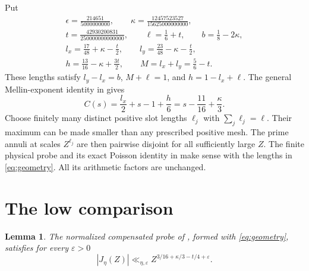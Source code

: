 \documentclass[11pt]{article}
\newtheorem{lemma}[theorem]{Lemma}
\begin{document}
Put
\begin{equation}\label{eq:geometry}
\begin{gathered}
 \epsilon=\frac{214651}{5000000000},\qquad
 \kappa=\frac{12457523527}{15625000000000},\\
 t=\frac{42930200831}{250000000000000},\qquad
 \ell=\frac16+t,\qquad b=\frac18-2\kappa,\\
 l_x=\frac{17}{48}+\kappa-\frac t2,\qquad
 l_y=\frac{23}{48}-\kappa-\frac t2,\\
 h=\frac{13}{16}-\kappa+\frac{3t}{2},\qquad
 M=l_x+l_y=\frac56-t.
\end{gathered}
\end{equation}
These lengths satisfy $l_y-l_x=b$, $M+\ell=1$, and
$h=1-l_x+\ell$. The general Mellin-exponent identity in
\cite[Part II, compensated low estimate]{OAI} gives
\begin{equation}\label{eq:signal}
 C(s)=\frac{l_x}{2}+s-1+\frac h6
     =s-\frac{11}{16}+\frac\kappa3.
\end{equation}
Choose finitely many distinct positive slot lengths $\ell_j$ with
$\sum_j\ell_j=\ell$. Their maximum can be made smaller than any prescribed
positive mesh. The prime annuli at scales $Z^{\ell_j}$ are then pairwise
disjoint for all sufficiently large $Z$. The finite physical
probe and its exact Poisson identity in \cite{OAI} make sense with the
lengths in \eqref{eq:geometry}. All its arithmetic factors are unchanged.

\section{The low comparison}\label{sec:low}

\begin{lemma}\label{lem:low}
The normalized compensated probe of \cite{OAI}, formed with
\eqref{eq:geometry}, satisfies for every $\varepsilon>0$
\[
       |J_\eta(Z)|\ll_{\eta,\varepsilon}
             Z^{3/16+\kappa/3-t/4+\varepsilon}.
\]
\end{lemma}
\end{document}
